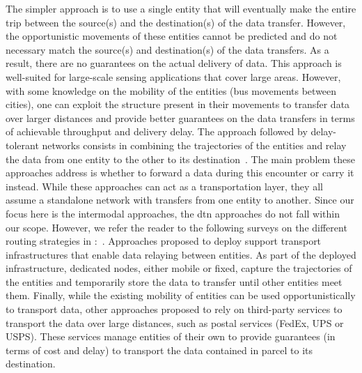 The simpler approach is to use a single entity that will eventually make the entire trip between the source(s) and the destination(s) of the data transfer. However, the opportunistic movements of these entities cannot be predicted and do not necessary match the source(s) and destination(s) of the data transfers. As a result, there are no guarantees on the actual delivery of data. This approach is well-suited for large-scale sensing applications that cover large areas. However, with some knowledge on the mobility of the entities (\eg bus movements between cities), one can exploit the structure present in their movements to transfer data over larger distances and provide better guarantees on the data transfers in terms of achievable throughput and delivery delay. The approach followed by delay-tolerant networks consists in combining the trajectories of the entities and relay the data from one entity to the other to its destination~\cite{fall2003delay}. The main problem these approaches address is whether to forward a data during this encounter or carry it instead. While these approaches can act as a transportation layer, they all assume a standalone network with transfers from one entity to another. Since our focus here is the intermodal approaches, the \acrshort{dtn} approaches do not fall within our scope. However, we refer the reader to the following surveys on the different routing strategies in :~\cite{zhang2006routing,spyropoulos2010routing,khabbaz2012disruption,pereira2012delay}. Approaches proposed to deploy support transport infrastructures that enable data relaying between entities. As part of the deployed infrastructure, dedicated nodes, either mobile or fixed, capture the trajectories of the entities and temporarily store the data to transfer until other entities meet them. Finally, while the existing mobility of entities can be used opportunistically to transport data, other approaches proposed to rely on third-party services to transport the data over large distances, such as postal services (\eg FedEx, UPS or USPS). These services manage entities of their own to provide guarantees (in terms of cost and delay) to transport the data contained in parcel to its destination. 



